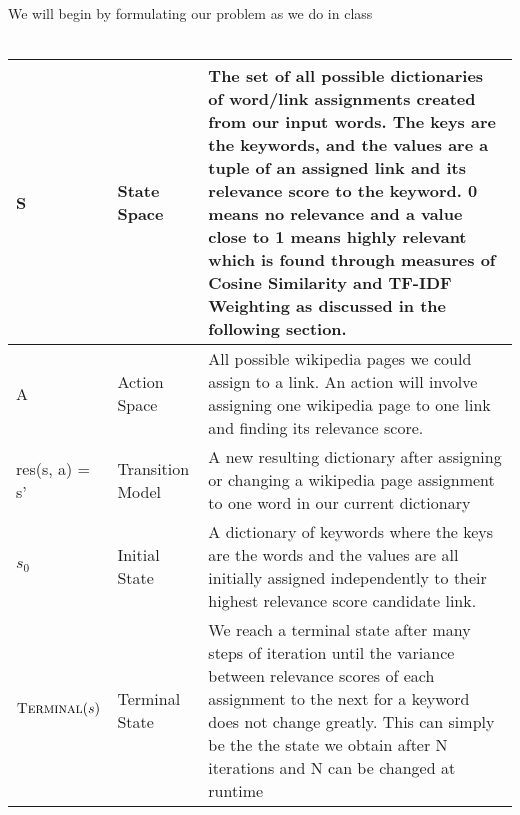 \documentclass[twoside,11pt]{article}
\begin{document}
We will begin by formulating our problem as we do in class
\\ \\
\begin{tabular}{|p{3cm}|p{3cm}|p{9cm}|}
\hline
S              & State Space      & The set of all possible dictionaries of word/link assignments created from our input words. The keys are the keywords, and the values are a tuple of an assigned link and its relevance score to the keyword. 0 means no relevance and a value close to 1 means highly relevant which is found through measures of Cosine Similarity and TF-IDF Weighting as discussed in the following section. \\ \hline
A              & Action Space     & All possible wikipedia pages we could assign to a link. An action will involve assigning one wikipedia page to one link and finding its relevance score.                                                                                                                                                                                                                                                                                                                                                                                           \\ \hline
res(s, a) = s' & Transition Model & A new resulting dictionary after assigning or changing a wikipedia page assignment to one word in our current dictionary                                                                                                                                                                                                                                                                                                                                                                                          \\ \hline
$s_0$             & Initial State    & A dictionary of keywords where the keys are the words and the values are all initially assigned independently to their highest relevance score candidate link.                                                                                                                                                                                                                                                                                                                                                                                    \\ \hline
$\mbox{\sc Terminal}(s)$             & Terminal State    & We reach a terminal state after many steps of iteration until the variance between relevance scores of each assignment to the next for a keyword does not change greatly. This can simply be the the state we obtain after N iterations and N can be changed at runtime                                                                                                                                                                                                                                                                                                                                                                                    \\ \hline
\end{tabular}
\end{document}
